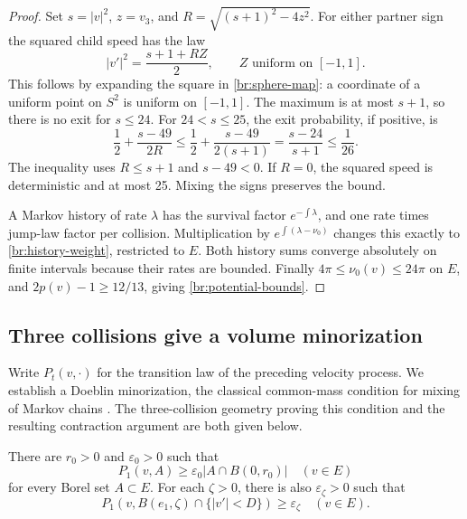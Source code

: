 \begin{proof}
Set \(s=|v|^2\), \(z=v_3\), and
\(R=\sqrt{(s+1)^2-4z^2}\). For either partner sign the squared child
speed has the law
\[
|v'|^2=\frac{s+1+RZ}{2},
\qquad Z\text{ uniform on }[-1,1].
\]
This follows by expanding the square in \eqref{br:sphere-map}: a
coordinate of a uniform point on \(S^2\) is uniform on \([-1,1]\).
The maximum is at most \(s+1\), so there is no exit for \(s\le24\).
For \(24<s\le25\), the exit probability, if positive, is
\[
\frac12+\frac{s-49}{2R}
\le\frac12+\frac{s-49}{2(s+1)}
=\frac{s-24}{s+1}\le\frac1{26}.
\]
The inequality uses \(R\le s+1\) and \(s-49<0\). If \(R=0\), the
squared speed is deterministic and at most 25. Mixing the signs
preserves the bound.

A Markov history of rate \(\lambda\) has the survival factor
\(e^{-\int\lambda}\), and one rate times jump-law factor per collision.
Multiplication by \(e^{\int(\lambda-\nu_0)}\) changes this exactly to
\eqref{br:history-weight}, restricted to \(E\). Both history sums
converge absolutely on finite intervals because their rates are bounded.
Finally \(4\pi\le\nu_0(v)\le24\pi\) on \(E\), and
\(2p(v)-1\ge12/13\), giving \eqref{br:potential-bounds}.
\end{proof}

\subsection{Three collisions give a volume minorization}

Write \(P_t(v,\cdot)\) for the transition law of the preceding velocity
process. We establish a Doeblin minorization, the classical common-mass
condition for mixing of Markov chains \cite{Doeblin1940}. The
three-collision geometry proving this condition and the resulting
contraction argument are both given below.

\begin{lemma}\label{br:minorization}
There are \(r_0>0\) and \(\varepsilon_0>0\) such that
\begin{equation}\label{br:doeblin}
P_1(v,A)\ge\varepsilon_0|A\cap B(0,r_0)|\quad(v\in E)
\end{equation}
for every Borel set \(A\subset E\). For each \(\zeta>0\), there is also
\(\varepsilon_\zeta>0\) such that
\[
P_1(v,B(e_1,\zeta)\cap\{|v'|<D\})\ge\varepsilon_\zeta\quad(v\in E).
\]
\end{lemma}

